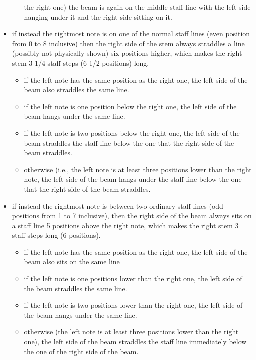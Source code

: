 \begin{itemize}
\begin{itemize}
    the right one) the beam is again on the middle staff line with the
    left side hanging under it and the right side sitting on it. 
  \end{itemize}
\item if instead the rightmost note is on one of the normal staff
  lines (even position from 0 to 8 inclusive) then the right side of
  the stem always straddles a line (possibly not physically shown) six
  positions higher, which makes the right stem 3 1/4 staff steps
  (6 1/2 positions) long. 
  \begin{itemize}
  \item if the left note has the same position as the right one, the
    left side of the beam also straddles the same line.
  \item if the left note is one position below the right one, the left
    side of the beam hangs under the same line.
  \item if the left note is two positions below the right one, the
    left side of the beam straddles the staff line below the one that
    the right side of the beam straddles.
  \item otherwise (i.e., the left note is at least three positions
    lower than the right note, the left side of the beam hangs under
    the staff line below the one that the right side of the beam
    straddles. 
  \end{itemize}
\item if instead the rightmost note is between two ordinary staff
  lines (odd positions from 1 to 7 inclusive), then the right side of
  the beam always sits on a staff line 5 positions above the right
  note, which makes the right stem 3 staff steps long (6 positions).
  \begin{itemize}
  \item if the left note has the same position as the right one, the
    left side of the beam also sits on the same line
  \item if the left note is one positions lower than the right one, the
    left side of the beam straddles the same line.
  \item if the left note is two positions lower than the right one,
    the left side of the beam hangs under the same line.
  \item otherwise (the left note is at least three positions lower
    than the right one), the left side of the beam straddles the staff
    line immediately below the one of the right side of the beam. 
  \end{itemize}

\end{itemize}
